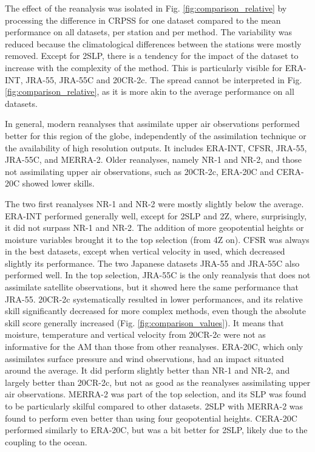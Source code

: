 \documentclass{ametsoc}
\begin{document}
The effect of the reanalysis was isolated in Fig. \ref{fig:comparison_relative} by processing the difference in CRPSS for one dataset compared to the mean performance on all datasets, per station and per method. The variability was reduced because the climatological differences between the stations were mostly removed. Except for 2SLP, there is a tendency for the impact of the dataset to increase with the complexity of the method. This is particularly visible for ERA-INT, JRA-55, JRA-55C and 20CR-2c. The spread cannot be interpreted in Fig. \ref{fig:comparison_relative}, as it is more akin to the average performance on all datasets.

In general, modern reanalyses that assimilate upper air observations performed better for this region of the globe, independently of the assimilation technique or the availability of high resolution outputs. It includes ERA-INT, CFSR, JRA-55, JRA-55C, and MERRA-2. Older reanalyses, namely NR-1 and NR-2, and those not assimilating upper air observations, such as 20CR-2c, ERA-20C and CERA-20C showed lower skills.

The two first reanalyses NR-1 and NR-2 were mostly slightly below the average. ERA-INT performed generally well, except for 2SLP and 2Z, where, surprisingly, it did not surpass NR-1 and NR-2. The addition of more geopotential heights or moisture variables brought it to the top selection (from 4Z on). CFSR was always in the best datasets, except when vertical velocity in used, which decreased slightly its performance. The two Japanese datasets JRA-55 and JRA-55C also performed well. In the top selection, JRA-55C is the only reanalysis that does not assimilate satellite observations, but it showed here the same performance that JRA-55. 20CR-2c systematically resulted in lower performances, and its relative skill significantly decreased for more complex methods, even though the absolute skill score generally increased (Fig. \ref{fig:comparison_values}). It means that moisture, temperature and vertical velocity from 20CR-2c were not as informative for the AM than those from other reanalyses. ERA-20C, which only assimilates surface pressure and wind observations, had an impact situated around the average. It did perform slightly better than NR-1 and NR-2, and largely better than 20CR-2c, but not as good as the reanalyses assimilating upper air observations. MERRA-2 was part of the top selection, and its SLP was found to be particularly skilful compared to other datasets. 2SLP with MERRA-2 was found to perform even better than using four geopotential heights. CERA-20C performed similarly to ERA-20C, but was a bit better for 2SLP, likely due to the coupling to the ocean.
\end{document}
